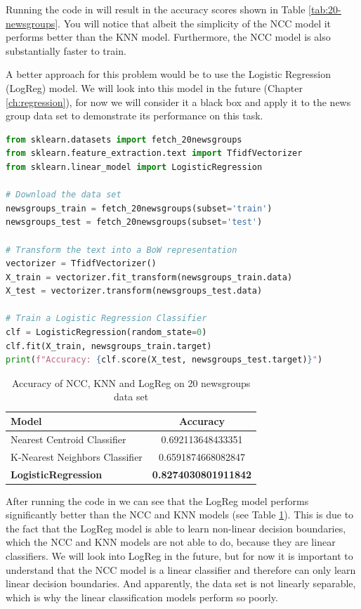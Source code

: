 Running the code in  will result in the accuracy scores shown in Table \ref{tab:20-newsgroups}.
You will notice that albeit the simplicity of the NCC model it performs better than the KNN model. Furthermore, the NCC model is also substantially faster to train.

A better approach for this problem would be to use the Logistic Regression (LogReg) model. We will look into this model in the future (Chapter \ref{ch:regression}), for now we will consider it a black box and apply it to the news group data set to demonstrate its performance on this task.

\begin{lstlisting}[language=Python, caption={20 newsgroups example with Logistic Regression}, label={code:20-newsgroups-lr}]
from sklearn.datasets import fetch_20newsgroups
from sklearn.feature_extraction.text import TfidfVectorizer
from sklearn.linear_model import LogisticRegression

# Download the data set
newsgroups_train = fetch_20newsgroups(subset='train')
newsgroups_test = fetch_20newsgroups(subset='test')

# Transform the text into a BoW representation
vectorizer = TfidfVectorizer()
X_train = vectorizer.fit_transform(newsgroups_train.data)
X_test = vectorizer.transform(newsgroups_test.data)

# Train a Logistic Regression Classifier
clf = LogisticRegression(random_state=0)
clf.fit(X_train, newsgroups_train.target)
print(f"Accuracy: {clf.score(X_test, newsgroups_test.target)}")
\end{lstlisting}
\begin{table}[h]
  \centering
  \begin{tabular}{|l|c|}
    \hline
    \textbf{Model} & \textbf{Accuracy} \\
    \hline
    Nearest Centroid Classifier & 0.692113648433351\\
    K-Nearest Neighbors Classifier & 0.6591874668082847\\
    \textbf{LogisticRegression} & \textbf{0.8274030801911842}\\
    \hline
  \end{tabular}
  \caption{Accuracy of NCC, KNN and LogReg on 20 newsgroups data set}
  \label{tab:20-newsgroups-extended}
\end{table}
After running the code in  we can see that the LogReg model performs significantly better than the NCC and KNN models (see Table \ref{tab:20-newsgroups-extended}).
This is due to the fact that the LogReg model is able to learn non-linear decision boundaries, which the NCC and KNN models are not able to do, because they are linear classifiers.
We will look into LogReg in the future, but for now it is important to understand that the NCC model is a linear classifier and therefore can only learn linear decision boundaries.
And apparently, the data set is not linearly separable, which is why the linear classification models perform so poorly.

